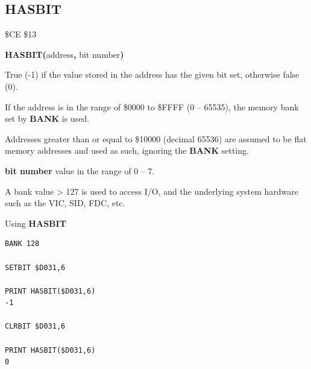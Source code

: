 \subsection{HASBIT}
\begin{description}[leftmargin=2cm,style=nextline]
\item [Token:]    \$CE \$13

\item [Format:]   {\bf HASBIT(}address{\bf,} bit number{\bf)}

\item [Returns:]  True (-1) if the value stored in the address has the given bit set, otherwise false (0).

                  If the address is in the range of \$0000 to \$FFFF (0 -- 65535), the memory bank set by {\bf BANK} is used.

                  Addresses greater than or equal to \$10000 (decimal 65536) are assumed to be flat memory addresses and used as such, ignoring the {\bf BANK} setting.

                  {\bf bit number} value in the range of 0 -- 7.

                  A bank value > 127 is used to access I/O, and the underlying system hardware such as the VIC, SID, FDC, etc.

\item [Examples:] Using {\bf HASBIT}

\begin{tcolorbox}[colback=black,coltext=white]
\verbatimfont{\codefont}
\begin{verbatim}
BANK 128

SETBIT $D031,6

PRINT HASBIT($D031,6)
-1

CLRBIT $D031,6

PRINT HASBIT($D031,6)
0
\end{verbatim}
\end{tcolorbox}
\end{description}


\newpage
